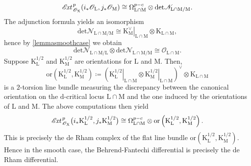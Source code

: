 \documentclass{article}
\theoremstyle{plain}
\theoremstyle{definition}
\theoremstyle{remark}
\newcommand{\mr}{\mathrm}
\newcommand{\3}{\vspace{3mm}}
\newcommand{\2}{\vspace{2mm}}
\newcommand{\1}{\vspace{1mm}}
\newcommand*{\ext}{\mathscr{E}\text{\kern -1.5pt {\it{xt}}}\,}
\begin{document}
 $$\ext^{p}_{\mathscr{O}_\mr{X}}(i_{*}\mathscr{O}_{\mr{L}},j_{*}\mathscr{O}_{\mr{M}}) \cong \Omega^{p-c}_{\mr{L}\cap\mr{M}} \otimes \mr{det}\mathscr{N}_{\mr{\mr{L}\cap\mr{M}/M}}.$$
 The adjunction formula yields an isomorphism $$\mr{det}\mathscr{N}_{\mr{\mr{L}\cap\mr{M}/M}} \cong \left.\mr{K}_{\mr{M}}^{\vee}\right|_{\mr{L}\cap\mr{M}}\otimes \mr{K}_{\mr{L}\cap \mr{M}},$$ hence by \cref{lemmasmoothcase} we obtain $$\mr{det\mathscr{N}_{\mr{L}\cap\mr{M}/L}\otimes det\mathscr{N}_{\mr{L}\cap\mr{M}/M}} \cong \mathscr{O}_{\mr{\mr{L}\cap\mr{M}}}.$$
 Suppose $\mr{K}^{1/2}_\mr{L}$ and $\mr{K}^{1/2}_\mr{M}$ are orientations for $\mr{L}$ and $\mr{M}$. Then, \begin{equation}\label{orind}\mr{or}\left(\mr{K}^{1/2}_\mr{L},\mr{K}^{1/2}_\mr{M}\right) \coloneqq \left(\mr{ \left.K_{L}^{1/2}\right|_{\mr{L}\cap\mr{M}}\otimes \left.K_{M}^{1/2}\right|_{\mr{L}\cap\mr{M}}}\right)^{\vee} \otimes \mr{K_{\mr{L}\cap\mr{M}}}
 \end{equation} is a $2$-torsion line bundle measuring the discrepancy between the canonical orientation on the $\mr{d}$-critical locus $\mr{L}\cap\mr{M}$ and the one induced by the orientations of $\mr{L}$ and $\mr{M}$. The above computations then yield $$\ext^{p}_{\mathscr{O}_\mr{X}}\big(i_{*}\mr{K_{L}^{1/2}},j_{*}\mr{K_{M}^{1/2}}\big) \cong \Omega^{p-c}_{\mr{\mr{L}\cap\mr{M}}} \otimes \mr{or}\left(\mr{K}^{1/2}_\mr{L},\mr{K}^{1/2}_\mr{M}\right).$$ This is precisely the de Rham complex of the flat line bundle $\mr{or}\left(\mr{K}^{1/2}_\mr{L},\mr{K}^{1/2}_\mr{M}\right)$. Hence in the smooth case, the Behrend-Fantechi differential is precisely the de Rham differential.
\end{document}
